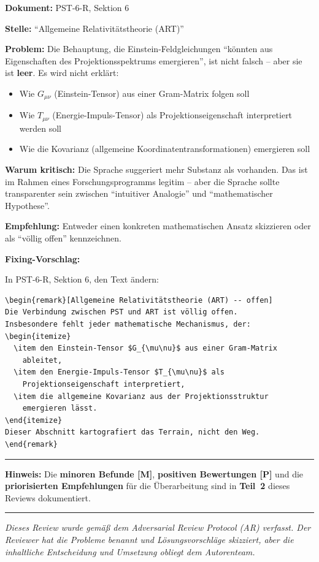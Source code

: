 \documentclass[11pt,a4paper]{article}
\newcommand{\Dok}[1]{\noindent\textbf{Dokument:} #1\par\smallskip}
\newcommand{\Stelle}[1]{\noindent\textbf{Stelle:} #1\par\smallskip}
\newcommand{\Prob}[1]{\noindent\textbf{Problem:} #1\par\smallskip}
\newcommand{\Krit}[1]{\noindent\textbf{Warum kritisch:} #1\par\smallskip}
\newcommand{\Empf}[1]{\noindent\textbf{Empfehlung:} #1\par\smallskip}
\newenvironment{Fix}
  {\par\medskip\noindent\textbf{Fixing-Vorschlag:}\par\nobreak\smallskip}
  {\par\medskip}
\begin{document}
\Dok{PST-6-R, Sektion 6}
\Stelle{``Allgemeine Relativitätstheorie (ART)''}
\Prob{Die Behauptung, die Einstein-Feldgleichungen ``könnten aus
Eigenschaften des Projektionsspektrums emergieren'', ist nicht
falsch -- aber sie ist \textbf{leer}. Es wird nicht erklärt:
\begin{itemize}
  \item Wie $G_{\mu\nu}$ (Einstein-Tensor) aus einer Gram-Matrix folgen
    soll
  \item Wie $T_{\mu\nu}$ (Energie-Impuls-Tensor) als
    Projektionseigenschaft interpretiert werden soll
  \item Wie die Kovarianz (allgemeine Koordinatentransformationen)
    emergieren soll
\end{itemize}}
\Krit{Die Sprache suggeriert mehr Substanz als vorhanden. Das ist
im Rahmen eines Forschungsprogramms legitim -- aber die Sprache
sollte transparenter sein zwischen ``intuitiver Analogie'' und
``mathematischer Hypothese''.}
\Empf{Entweder einen konkreten mathematischen Ansatz skizzieren
oder als ``völlig offen'' kennzeichnen.}
\begin{Fix}
In PST-6-R, Sektion 6, den Text ändern:
\begin{verbatim}
\begin{remark}[Allgemeine Relativitätstheorie (ART) -- offen]
Die Verbindung zwischen PST und ART ist völlig offen.
Insbesondere fehlt jeder mathematische Mechanismus, der:
\begin{itemize}
  \item den Einstein-Tensor $G_{\mu\nu}$ aus einer Gram-Matrix
    ableitet,
  \item den Energie-Impuls-Tensor $T_{\mu\nu}$ als
    Projektionseigenschaft interpretiert,
  \item die allgemeine Kovarianz aus der Projektionsstruktur
    emergieren lässt.
\end{itemize}
Dieser Abschnitt kartografiert das Terrain, nicht den Weg.
\end{remark}
\end{verbatim}
\end{Fix}

\newpage


\vspace{2em}
\noindent\rule{\textwidth}{0.4pt}
\vspace{1em}

\noindent\textbf{Hinweis:} Die \textbf{minoren Befunde [M]},
\textbf{positiven Bewertungen [P]} und die \textbf{priorisierten
Empfehlungen} für die Überarbeitung sind in \textbf{Teil~2}
dieses Reviews dokumentiert.

\vspace{2em}

\begin{center}
\rule{0.5\textwidth}{0.4pt}
\end{center}

\vspace{1em}

\noindent\textit{Dieses Review wurde gemäß dem Adversarial Review
Protocol (AR) verfasst. Der Reviewer hat die Probleme benannt und
Lösungsvorschläge skizziert, aber die inhaltliche Entscheidung
und Umsetzung obliegt dem Autorenteam.}
\end{document}
